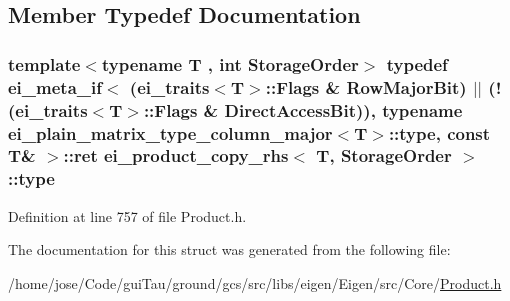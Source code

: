 \subsection{Member Typedef Documentation}
\hypertarget{structei__product__copy__rhs_a2e6fae70002bc52ee5d3f10e34bd28c5}{
\subsubsection[{type}]{\setlength{\rightskip}{0pt plus 5cm}template$<$typename T , int Storage\-Order$>$ typedef {\bf ei\-\_\-meta\-\_\-if}$<$ ({\bf ei\-\_\-traits}$<$T$>$\-::Flags \& {\bf Row\-Major\-Bit}) $|$$|$ (!({\bf ei\-\_\-traits}$<$T$>$\-::Flags \& {\bf Direct\-Access\-Bit})), typename {\bf ei\-\_\-plain\-\_\-matrix\-\_\-type\-\_\-column\-\_\-major}$<$T$>$\-::{\bf type}, const T\& $>$\-::{\bf ret} {\bf ei\-\_\-product\-\_\-copy\-\_\-rhs}$<$ T, Storage\-Order $>$\-::{\bf type}}}\label{structei__product__copy__rhs_a2e6fae70002bc52ee5d3f10e34bd28c5}


Definition at line 757 of file Product.\-h.



The documentation for this struct was generated from the following file\-:\begin{DoxyCompactItemize}
\item 
/home/jose/\-Code/gui\-Tau/ground/gcs/src/libs/eigen/\-Eigen/src/\-Core/\hyperlink{_product_8h}{Product.\-h}\end{DoxyCompactItemize}
